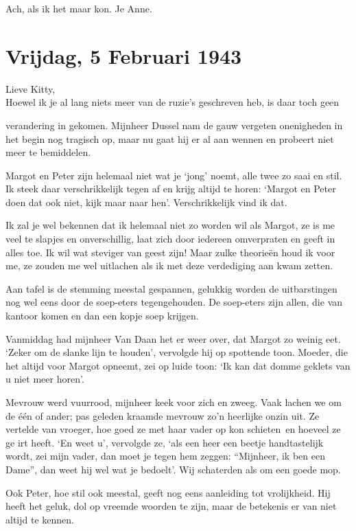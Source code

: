 \documentclass{book}
\begin{document}
Ach, als ik het maar kon. Je Anne.

\chapter{Vrijdag, 5 Februari 1943}

Lieve Kitty,\\Hoewel ik je al lang niets meer van de ruzie's geschreven
heb, is daar toch geen

verandering in gekomen. Mijnheer Dussel nam de gauw vergeten onenigheden
in het begin nog tragisch op, maar nu gaat hij er al aan wennen en
probeert niet meer te bemiddelen.

Margot en Peter zijn helemaal niet wat je `jong' noemt, alle twee zo
saai en stil. Ik steek daar verschrikkelijk tegen af en krijg altijd te
horen: `Margot en Peter doen dat ook niet, kijk maar naar hen'.
Verschrikkelijk vind ik dat.

Ik zal je wel bekennen dat ik helemaal niet zo worden wil als Margot, ze
is me veel te slapjes en onverschillig, laat zich door iedereen
omverpraten en geeft in alles toe. Ik wil wat steviger van geest zijn!
Maar zulke theorieën houd ik voor me, ze zouden me wel uitlachen als ik
met deze verdediging aan kwam zetten.

Aan tafel is de stemming meestal gespannen, gelukkig worden de
uitbarstingen nog wel eens door de soep-eters tegengehouden. De
soep-eters zijn allen, die van kantoor komen en dan een kopje soep
krijgen.

Vanmiddag had mijnheer Van Daan het er weer over, dat Margot zo weinig
eet. `Zeker om de slanke lijn te houden', vervolgde hij op spottende
toon. Moeder, die het altijd voor Margot opneemt, zei op luide toon: `Ik
kan dat domme geklets van u niet meer horen'.

Mevrouw werd vuurrood, mijnheer keek voor zich en zweeg. Vaak lachen we
om de één of ander; pas geleden kraamde mevrouw zo'n heerlijke onzin
uit. Ze vertelde van vroeger, hoe goed ze met haar vader op kon
schieten~en hoeveel ze ge irt heeft. `En weet u', vervolgde ze, `als een
heer een beetje handtastelijk wordt, zei mijn vader, dan moet je tegen
hem zeggen: ``Mijnheer, ik ben een Dame'', dan weet hij wel wat je
bedoelt'. Wij schaterden als om een goede mop.

Ook Peter, hoe stil ook meestal, geeft nog eens aanleiding tot
vrolijkheid. Hij heeft het geluk, dol op vreemde woorden te zijn, maar
de betekenis er van niet altijd te kennen.
\end{document}
